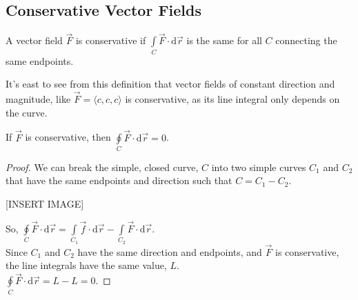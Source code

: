 \subsection{Conservative Vector Fields}
\begin{definition}
	A vector field $\vec{F}$ is conservative if $\int\limits_{C}{\vec{F} \cdot \mathrm{d}\vec{r}}$ is the same for all $C$ connecting the same endpoints.
\end{definition}

\noindent
It's east to see from this definition that vector fields of constant direction and magnitude, like $\vec{F}=\langle c, c, c \rangle$ is conservative, as its line integral only depends on the curve.\\

\begin{theorem}
	If $\vec{F}$ is conservative, then $\oint\limits_{C}{\vec{F} \cdot \mathrm{d}\vec{r}} = 0$.
\end{theorem}
\begin{proof}
	We can break the simple, closed curve, $C$ into two simple curves $C_1$ and $C_2$ that have the same endpoints and direction such that $C = C_1-C_2$.
	
	[INSERT IMAGE]
	
	\noindent
	So, $\oint\limits_{C}{\vec{F} \cdot \mathrm{d}\vec{r}} = \int\limits_{C_1}{\vec{f} \cdot \mathrm{d}\vec{r}} - \int\limits_{C_2}{\vec{F} \cdot \mathrm{d}\vec{r}}$.\\
	Since $C_1$ and $C_2$ have the same direction and endpoints, and $\vec{F}$ is conservative, the line integrals have the same value, $L$.\\
	$\oint\limits_{C}{\vec{F} \cdot \mathrm{d}\vec{r}} = L - L = 0$.
\end{proof}